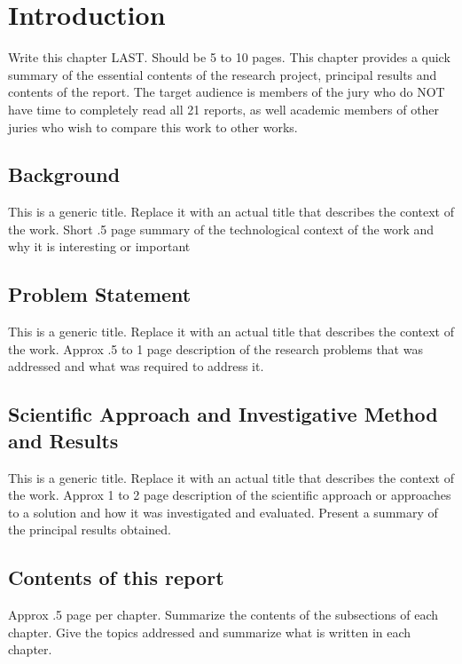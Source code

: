 \chapter{Introduction}

Write this chapter LAST. Should be 5 to 10 pages. This chapter provides a quick summary of the
essential contents of the research project, principal results and contents of the report. The target
audience is members of the jury who do NOT have time to completely read all 21 reports, as well
academic members of other juries who wish to compare this work to other works.

\section{Background}
This is a generic title. Replace it with an actual title that describes the context of the work.
Short .5 page summary of the technological context of the work and why it is interesting or
important

\section{Problem Statement}
This is a generic title. Replace it with an actual title that describes the context of the work.
Approx .5 to 1 page description of the research problems that was addressed and what was
required to address it.

\section{Scientific Approach and Investigative Method and Results}
This is a generic title. Replace it with an actual title that describes the context of the work.
Approx 1 to 2 page description of the scientific approach or approaches to a solution and how it
was investigated and evaluated. Present a summary of the principal results obtained.

\section{Contents of this report}
Approx .5 page per chapter. Summarize the contents of the subsections of each chapter. Give the
topics addressed and summarize what is written in each chapter. 






